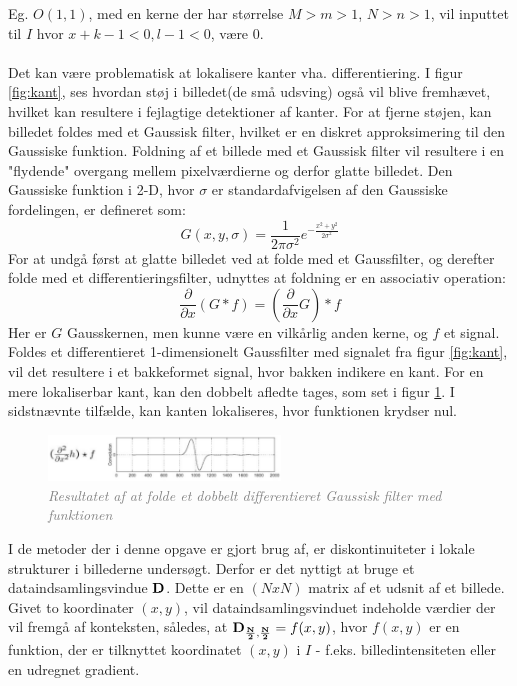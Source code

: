Eg. $O(1,1)$, med en kerne der har størrelse $M > m > 1$, $N > n > 1$, vil inputtet til $I$ hvor $x+k-1 < 0, l-1 < 0$, være $0$. \\
\\
Det kan være problematisk at lokalisere kanter vha. differentiering. I figur \ref{fig:kant}, ses hvordan støj i billedet(de små udsving) også vil blive fremhævet, hvilket kan resultere i fejlagtige detektioner af kanter. For at fjerne støjen, kan billedet foldes med et Gaussisk filter, hvilket er en diskret approksimering til den Gaussiske funktion. Foldning af et billede med et Gaussisk filter vil resultere i en "flydende" overgang mellem pixelværdierne og derfor glatte billedet. Den Gaussiske funktion i 2-D, hvor $ \sigma $ er standardafvigelsen af den Gaussiske fordelingen, er defineret som:
\begin{equation}
G(x,y,\sigma) = \frac{1}{2 \pi \sigma ^{2}} e^{- \frac{x^{2} + y^{2}}{2 \sigma ^{2}}}
\label{2dgaussian}
\end{equation} 
For at undgå først at glatte billedet ved at folde med et Gaussfilter, og derefter folde med et differentieringsfilter, udnyttes at foldning er en associativ operation:
\begin{equation}
\dfrac{\partial}{\partial x}(G \ast f) = (\dfrac{\partial}{\partial x}G) \ast f
\end{equation}
Her er $G$ Gausskernen, men kunne være en vilkårlig anden kerne, og $f$ et signal. \\
Foldes et differentieret 1-dimensionelt Gaussfilter med signalet fra figur \ref{fig:kant}, vil det resultere i et bakkeformet signal, hvor bakken indikere en kant. For en mere lokaliserbar kant, kan den dobbelt afledte tages, som set i figur \ref{fig:deriv}. I sidstnævnte tilfælde, kan kanten lokaliseres, hvor funktionen krydser nul.
\begin{figure}[H]
    \centering
    \includegraphics[width=0.55\textwidth]{fig/8.png}
    \vspace{-1em}   
    \begin{center}
    \caption{\textcolor{gray}{\footnotesize \textit{
     Resultatet af at folde et dobbelt differentieret Gaussisk filter med funktionen}}}
    \label{fig:deriv}
     \end{center}
    \vspace{-2.5em}  
  \end{figure}
\noindent
I de metoder der i denne opgave er gjort brug af, er diskontinuiteter i lokale strukturer i billederne undersøgt. Derfor er det nyttigt at bruge et dataindsamlingsvindue $\bold{D}$. Dette er en $(NxN)$ matrix af et udsnit af et billede. Givet to koordinater $(x,y)$, vil dataindsamlingsvinduet indeholde værdier der vil fremgå af konteksten, således, at $\bold{D_{\frac{N}{2},\frac{N}{2}}} = f(x,y)$, hvor $f(x,y)$ er en funktion, der er tilknyttet koordinatet $(x,y)$ i $I$ - f.eks. billedintensiteten eller en udregnet gradient.  